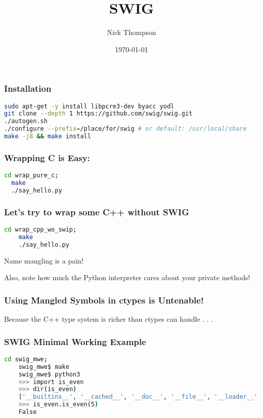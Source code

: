 \documentclass{beamer}
\begin{document}
\title{SWIG}
\author{Nick Thompson} 
\date{\today} 

\frame{\titlepage} 


\begin{frame}[fragile]
\frametitle{Installation}

\begin{lstlisting}[language=bash]
sudo apt-get -y install libpcre3-dev byacc yodl
git clone --depth 1 https://github.com/swig/swig.git
./autogen.sh
./configure --prefix=/place/for/swig # or default: /usr/local/share
make -j8 && make install
\end{lstlisting}
\end{frame}

\begin{frame}[fragile]
\frametitle{Wrapping C is Easy:}
\begin{lstlisting}[language=bash]
  cd wrap_pure_c;
  make
  ./say_hello.py
\end{lstlisting}
\end{frame}

\begin{frame}[fragile]
  \frametitle{Let's try to wrap some C++ without SWIG}
  \begin{lstlisting}[language=bash]
    cd wrap_cpp_wo_swip;
    make
    ./say_hello.py
  \end{lstlisting}
  Name mangling is a pain!
  
  Also, note how much the Python interpreter cares about your private methods!
\end{frame}

\begin{frame}
  \frametitle{Using Mangled Symbols in ctypes is Untenable!}
  Because the C++ type system is richer than ctypes can handle . . . 
\end{frame}

\begin{frame}[fragile]
  \frametitle{SWIG Minimal Working Example}
  \begin{lstlisting}[language=bash]
    cd swig_mwe;
    swig_mwe$ make
    swig_mwe$ python3
    >>> import is_even
    >>> dir(is_even)
    ['__builtins__', '__cached__', '__doc__', '__file__', '__loader__', '__name__', '__package__', '__spec__', '_is_even', '_newclass', '_object', '_swig_getattr', '_swig_getattr_nondynamic', '_swig_property', '_swig_repr', '_swig_setattr', '_swig_setattr_nondynamic', 'is_even']
    >>> is_even.is_even(5)
    False
  \end{lstlisting}
\end{frame}
\end{document}
